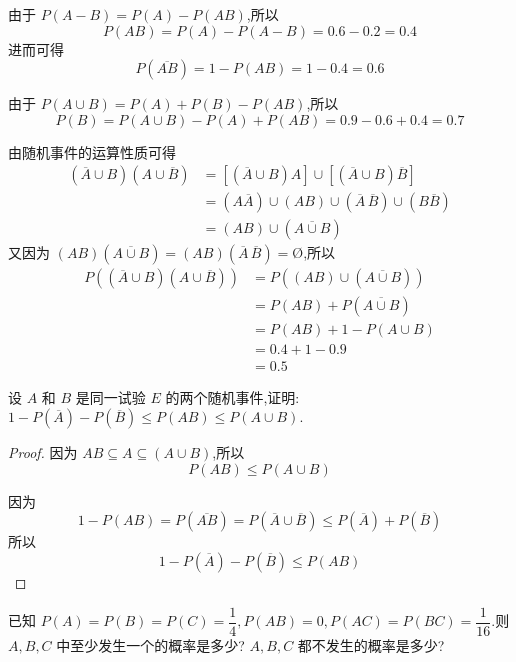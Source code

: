\begin{solution}
    由于 $P(A-B) = P(A) - P(AB)$,所以
    $$
    P(AB) = P(A) - P(A-B) = 0.6 - 0.2 = 0.4
    $$
    进而可得
    $$
    P(\overline{AB}) = 1 - P(AB) = 1 - 0.4 = 0.6
    $$

    由于 $P(A \cup B) = P(A) + P(B) - P(AB)$,所以
    $$
    P(B) = P(A \cup B) - P(A) + P(AB) = 0.9 - 0.6 + 0.4 = 0.7
    $$

    由随机事件的运算性质可得
    $$
    \begin{aligned}
        (\overline{A} \cup B)(A \cup \overline{B}) &= [(\overline{A} \cup B) A] \cup [(\overline{A} \cup B) \overline{B}] \\
        &= (A \overline{A}) \cup (AB) \cup (\overline{A} \, \overline{B}) \cup (B \overline{B}) \\
        &= (AB) \cup (\overline{A \cup B})
    \end{aligned}
    $$
    又因为 $(AB)(\overline{A \cup B}) = (AB)(\overline{A} \, \overline{B}) = \text{\O}$,所以
    $$
    \begin{aligned}
        P((\overline{A} \cup B)(A \cup \overline{B})) &= P((AB) \cup (\overline{A \cup B})) \\
        &= P(AB) + P(\overline{A \cup B}) \\
        &= P(AB) + 1 - P(A \cup B) \\
        &= 0.4 + 1 - 0.9 \\
        &= 0.5
    \end{aligned}
    $$
\end{solution}

\vspace{1em}

\question 设 $A$ 和 $B$ 是同一试验 $E$ 的两个随机事件,证明: $1 - P(\overline{A}) - P(\overline{B}) \leqslant P(AB) \leqslant P(A \cup B)$.

\begin{proof}
    因为 $AB \subseteq A \subseteq (A \cup B)$,所以
    $$
    P(AB) \leqslant P(A \cup B)
    $$

    因为
    $$
    1 - P(AB) = P(\overline{AB}) = P(\overline{A} \cup \overline{B}) \leqslant P(\overline{A}) + P(\overline{B})
    $$
    所以
    $$
    1 - P(\overline{A}) - P(\overline{B}) \leqslant P(AB)
    $$
\end{proof}

\question 已知 $P(A) = P(B) = P(C) = \dfrac{1}{4}, P(AB) = 0, P(AC) = P(BC) = \dfrac{1}{16}$.则 $A,B,C$ 中至少发生一个的概率是多少? $A,B,C$ 都不发生的概率是多少?

